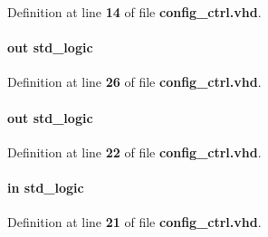Definition at line {\bf 14} of file {\bf config\+\_\+ctrl.\+vhd}.

\paragraph[{config\+\_\+data}]{ {\bfseries \textcolor{keywordflow}{out}\textcolor{vhdlchar}{ }} {\bfseries \textcolor{comment}{std\+\_\+logic}\textcolor{vhdlchar}{ }} \hspace{0.3cm}{\ttfamily [Port]}}\label{classconfig__ctrl_a81958b4160f9da2ce49e5e48b3eb2ba9}


Definition at line {\bf 26} of file {\bf config\+\_\+ctrl.\+vhd}.

\paragraph[{en\+\_\+clk}]{ {\bfseries \textcolor{keywordflow}{out}\textcolor{vhdlchar}{ }} {\bfseries \textcolor{comment}{std\+\_\+logic}\textcolor{vhdlchar}{ }} \hspace{0.3cm}{\ttfamily [Port]}}\label{classconfig__ctrl_a085a4c03269afc9d93dc53ce3b3f5076}


Definition at line {\bf 22} of file {\bf config\+\_\+ctrl.\+vhd}.

\paragraph[{en\+\_\+config}]{ {\bfseries \textcolor{keywordflow}{in}\textcolor{vhdlchar}{ }} {\bfseries \textcolor{comment}{std\+\_\+logic}\textcolor{vhdlchar}{ }} \hspace{0.3cm}{\ttfamily [Port]}}\label{classconfig__ctrl_ad4f3b57350c020d11978a4a89869d647}


Definition at line {\bf 21} of file {\bf config\+\_\+ctrl.\+vhd}.

